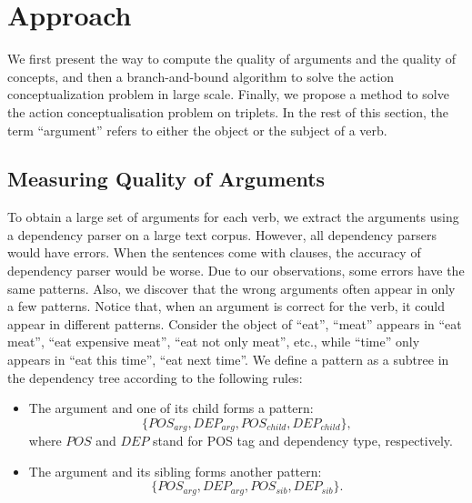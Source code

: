 \section{Approach}
\label{sec:algo}
We first present the way to compute the quality of
arguments and the quality of concepts, and then
a branch-and-bound algorithm to solve the
action conceptualization problem in large scale.
Finally, we propose a method to solve the action
conceptualisation problem on triplets.
In the rest of this section, the term ``argument'' refers to either
the object or the subject of a verb.

\subsection{Measuring Quality of Arguments}
To obtain a large set of arguments for each verb, we extract the arguments
using a dependency parser on a large text corpus. However, all dependency
parsers would have errors. When the sentences come with clauses, the
accuracy of dependency parser would be worse. Due to our observations,
some errors have the same patterns.  Also, we discover that the
wrong arguments often appear in only a few patterns. Notice that, when an
argument is correct for the verb, it could appear in different patterns.
Consider the object of ``eat'', ``meat'' appears in ``eat meat'', ``eat expensive meat'', ``eat not only meat'',
etc., while ``time'' only appears in ``eat this time'', ``eat next time''.
We define a pattern as a subtree in the dependency tree
according to the following rules:
\begin{itemize}
\item The argument and one of its child
forms a pattern:
$$\{POS_{arg}, DEP_{arg}, POS_{child}, DEP_{child}\},$$
where $POS$ and $DEP$ stand for POS tag and dependency type, respectively.
\item The argument and its sibling forms another pattern:
$$\{POS_{arg}, DEP_{arg}, POS_{sib}, DEP_{sib}\}.$$
\end{itemize}

